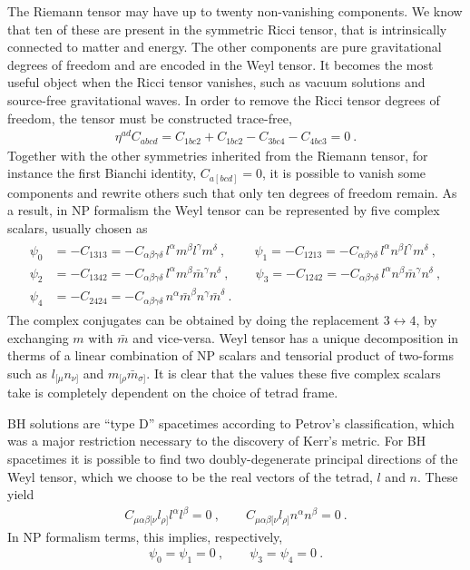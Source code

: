 The Riemann tensor may have up to twenty non-vanishing components.
We know that ten of these are present in the symmetric Ricci tensor, that is intrinsically connected to matter and energy.
The other components are pure gravitational degrees of freedom and are encoded in the Weyl tensor.
It becomes the most useful object when the Ricci tensor vanishes, such as vacuum solutions and source-free gravitational waves.
In order to remove the Ricci tensor degrees of freedom, the tensor must be constructed trace-free,
\begin{align}
    \eta^{ad} C_{abcd} = C_{1bc2} + C_{1bc2} - C_{3bc4} - C_{4bc3} = 0 ~. 
\end{align}
Together with the other symmetries inherited from the Riemann tensor, for instance the first Bianchi identity, $C_{a[bcd]}=0$, it is possible to vanish some components and rewrite others such that only ten degrees of freedom remain.
As a result, in NP formalism the Weyl tensor can be represented by five complex scalars, usually chosen as
\begin{align}
    \begin{split}
        \psi_0 &= - C_{1313} = - C_{\alpha\beta\gamma\delta}\, l^\alpha m^\beta l^\gamma m^\delta ~,\qquad
        ~\psi_1 = - C_{1213} = - C_{\alpha\beta\gamma\delta}\, l^\alpha n^\beta l^\gamma m^\delta ~,\\
        \psi_2 &= - C_{1342} = - C_{\alpha\beta\gamma\delta}\, l^\alpha m^\beta \bar{m}^\gamma n^\delta ~,\qquad
        \psi_3 = - C_{1242} = - C_{\alpha\beta\gamma\delta}\, l^\alpha n^\beta \bar{m}^\gamma n^\delta ~,\\
        \psi_4 &= - C_{2424} = - C_{\alpha\beta\gamma\delta}\, n^\alpha \bar{m}^\beta n^\gamma \bar{m}^\delta ~.
    \end{split}
\end{align}
The complex conjugates can be obtained by doing the replacement $3\leftrightarrow 4$, by exchanging $m$ with $\bar{m}$ and vice-versa. 
Weyl tensor has a unique decomposition in therms of a linear combination of NP scalars and tensorial product of two-forms such as $l_{[\mu} n_{\nu]}$ and $m_{[\rho} \bar{m}_{\sigma]}$. 
It is clear that the values these five complex scalars take is completely dependent on the choice of tetrad frame. 

BH solutions are ``type D'' spacetimes according to Petrov's classification, which was a major restriction necessary to the discovery of Kerr's metric.
For BH spacetimes it is possible to find two doubly-degenerate principal directions of the Weyl tensor, which we choose to be the real vectors of the tetrad, $l$ and $n$.
These yield
\begin{align}
    C_{\mu\alpha\beta[\nu} l_{\rho]} l^\alpha l^\beta = 0 ~, \qquad C_{\mu\alpha\beta[\nu} l_{\rho]} n^\alpha n^\beta = 0  ~.
\end{align}
In NP formalism terms, this implies, respectively,
\begin{align}
    \psi_0=\psi_1=0 ~,\qquad \psi_3=\psi_4=0 ~.
\end{align}

